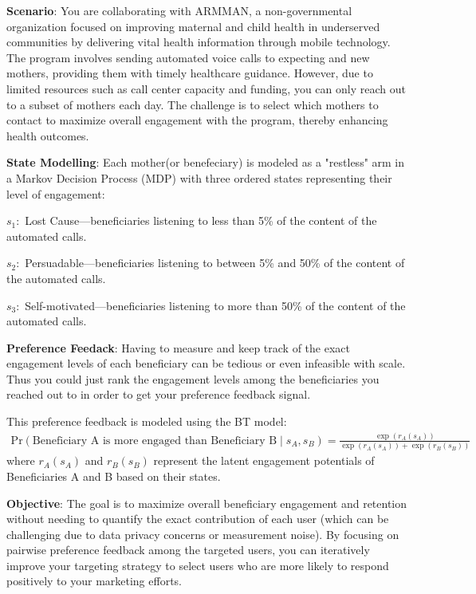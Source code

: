 \documentclass{article} %
\begin{document}
{\textbf{Scenario}: You are collaborating with ARMMAN, a non-governmental organization focused on improving maternal and child health in underserved communities by delivering vital health information through mobile technology. The program involves sending automated voice calls to expecting and new mothers, providing them with timely healthcare guidance. However, due to limited resources such as call center capacity and funding, you can only reach out to a subset of mothers each day. The challenge is to select which mothers to contact to maximize overall engagement with the program, thereby enhancing health outcomes.


\textbf{State Modelling}: Each mother(or benefeciary) is modeled as a "restless" arm in a Markov Decision Process (MDP) with three ordered states representing their level of engagement:

$ s_1:$ Lost Cause—beneficiaries listening to less than 5\% of the content of the automated calls.

$ s_2:$ Persuadable—beneficiaries listening to between 5\% and 50\% of the content of the automated calls.

$ s_3:$ Self-motivated—beneficiaries listening to more than 50\% of the content of the automated calls.



\textbf{Preference Feedack}: Having to measure and keep track of the exact engagement levels of each beneficiary can be tedious or even infeasible with scale. Thus you could just rank the engagement levels among the beneficiaries you reached out to in order to get your preference feedback signal.

This preference feedback is modeled using the BT model:
\begin{align*}
   \text{Pr}(\text{Beneficiary A is more engaged than Beneficiary B} \mid s_A, s_B) = \frac{\exp(r_A(s_A))}{\exp(r_A(s_A)) + \exp(r_B(s_B))}
\end{align*}
where $r_A(s_A)$ and $r_B(s_B)$ represent the latent engagement potentials of Beneficiaries A and B based on their states.



\textbf{Objective}: The goal is to maximize overall beneficiary engagement and retention without needing to quantify the exact contribution of each user (which can be challenging due to data privacy concerns or measurement noise). By focusing on pairwise preference feedback among the targeted users, you can iteratively improve your targeting strategy to select users who are more likely to respond positively to your marketing efforts.

}
\end{document}

